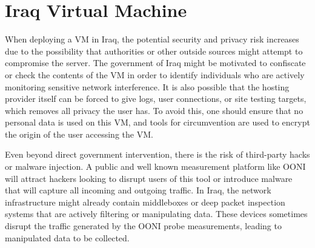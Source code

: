 \section{Iraq Virtual Machine}

When deploying a VM in Iraq, the potential security and privacy risk increases due to the possibility that authorities or other outside sources might attempt to compromise the server. The government of Iraq might be motivated to confiscate or check the contents of the VM in order to identify individuals who are actively monitoring sensitive network interference. It is also possible that the hosting provider itself can be forced to give logs, user connections, or site testing targets, which removes all privacy the user has. To avoid this, one should ensure that no personal data is used on this VM, and tools for circumvention are used to encrypt the origin of the user accessing the VM.

Even beyond direct government intervention, there is the risk of third-party hacks or malware injection. A public and well known measurement platform like OONI will attract hackers looking to disrupt users of this tool or introduce malware that will capture all incoming and outgoing traffic. In Iraq, the network infrastructure might already contain middleboxes or deep packet inspection systems that are actively filtering or manipulating data. These devices sometimes disrupt the traffic generated by the OONI probe measurements, leading to manipulated data to be collected.




